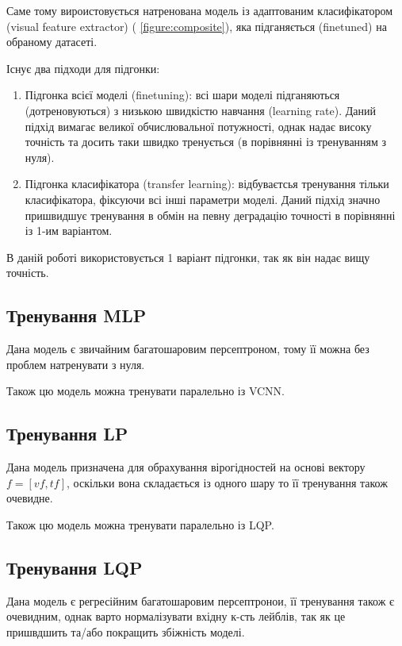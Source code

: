 \documentclass{udstu}
\begin{document}
Саме тому вироистовується натренована модель із адаптованим класифікатором (visual feature extractor) (\figurename{ \ref{figure:composite}}), яка підганяється (finetuned) на обраному датасеті.

Існує два підходи для підгонки:

\begin{enumerate}[1)]
	\item Підгонка всієї моделі (finetuning):
	всі шари моделі підганяються (дотреновуються) з низькою швидкістю навчання (learning rate).
	Даний підхід вимагає великої обчислювальної потужності, однак надає високу точність та
	досить таки швидко тренується (в порівнянні із тренуванням з нуля).

	\item Підгонка класифікатора (transfer learning):
	відбуваєтсья тренування тільки класифікатора, фіксуючи всі інші параметри моделі.
	Даний підхід значно пришвидшує тренування в обмін на певну деградацію точності в порівнянні із 1-им варіантом.
\end{enumerate}

В даній роботі використовується 1 варіант підгонки, так як він надає вищу точність.


\subsection{Тренування MLP}

Дана модель є звичайним багатошаровим персептроном, тому її
можна без проблем натренувати з нуля.

Також цю модель можна тренувати паралельно із VCNN.


\subsection{Тренування LP}

Дана модель призначена для обрахування вірогідностей на основі вектору $f = [vf, tf]$, оскільки вона
складається із одного шару то її тренування також очевидне.

Також цю модель можна тренувати паралельно із LQP.


\subsection{Тренування LQP}

Дана модель є регресійним багатошаровим персептронои, її тренування також є очевидним,
однак варто нормалізувати вхідну к-сть лейблів, так як це пришвдшить та/або покращить збіжність моделі.
\end{document}
